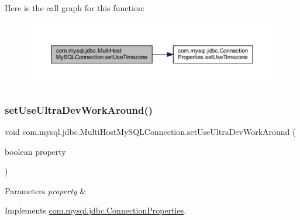 Here is the call graph for this function\+:
\nopagebreak
\begin{figure}[H]
\begin{center}
\leavevmode
\includegraphics[width=350pt]{classcom_1_1mysql_1_1jdbc_1_1_multi_host_my_s_q_l_connection_a3854f7fb3b5d199edae3890e38bf9b7c_cgraph}
\end{center}
\end{figure}
\mbox{\label{classcom_1_1mysql_1_1jdbc_1_1_multi_host_my_s_q_l_connection_a2280fcb76a916e625848333e80572871}} 
\subsubsection{\texorpdfstring{set\+Use\+Ultra\+Dev\+Work\+Around()}{setUseUltraDevWorkAround()}}
{\footnotesize\ttfamily void com.\+mysql.\+jdbc.\+Multi\+Host\+My\+S\+Q\+L\+Connection.\+set\+Use\+Ultra\+Dev\+Work\+Around (\begin{DoxyParamCaption}\item[{boolean}]{property }\end{DoxyParamCaption})}


\begin{DoxyParams}{Parameters}
{\em property} & \\
\hline
\end{DoxyParams}


Implements \mbox{\hyperlink{interfacecom_1_1mysql_1_1jdbc_1_1_connection_properties_af0a84465de479a1eea05763a2ae4cc37}{com.\+mysql.\+jdbc.\+Connection\+Properties}}.

